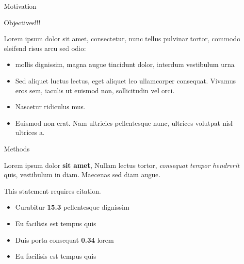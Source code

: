\documentclass[final,8pt]{beamer} %
\newlength{\onecolwid}
\begin{document}
\begin{frame}[t]
\begin{columns}[t]
\begin{column}{\onecolwid}
\begin{block}{Motivation {}}
    \end{block}



\begin{block}{Objectives!!!}

    Lorem  ipsum dolor sit amet, consectetur, nunc tellus pulvinar tortor, commodo eleifend risus arcu sed odio:
    \begin{itemize}
    \item mollis dignissim, magna augue tincidunt dolor, interdum vestibulum urna
    \item Sed aliquet luctus lectus, eget aliquet leo ullamcorper consequat. Vivamus eros sem, iaculis ut euismod non, sollicitudin vel orci.
    \item Nascetur ridiculus mus.  
    \item Euismod non erat. Nam ultricies pellentesque nunc, ultrices volutpat nisl ultrices a.
    \end{itemize}
    
    \end{block}


\begin{block}{Methods}

    Lorem ipsum dolor \textbf{sit amet}, Nullam lectus tortor, \textit{consequat tempor hendrerit} quis, vestibulum in diam. Maecenas sed diam augue.
    
    This statement requires citation.
    
    \end{block}
    
    
    \begin{itemize}
        \item Curabitur \textbf{15.3} pellentesque dignissim
        \item Eu facilisis est tempus quis
        \item Duis porta consequat \textbf{0.34} lorem
        \item Eu facilisis est tempus quis
        \end{itemize}


\end{column}
\end{columns}
\end{frame}
\end{document}

